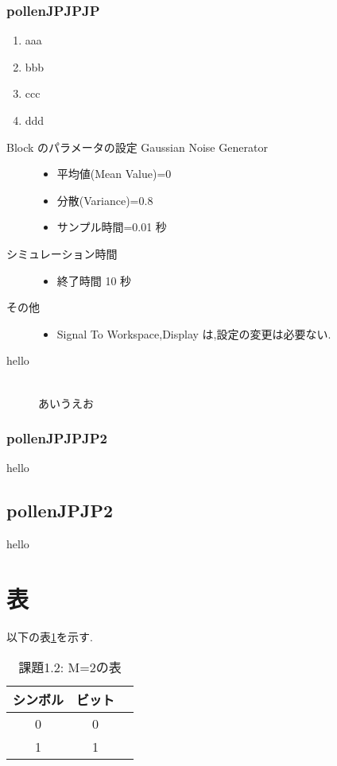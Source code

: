 \documentclass{jsarticle}			%
\begin{document}
			\subsubsection{pollenJPJPJP}
				\begin{enumerate}
					\item aaa
					\item bbb
					\item ccc
					\item ddd
				\end{enumerate}
				\begin{description}
					\item[Block のパラメータの設定 Gaussian Noise Generator]\mbox{}
						\begin{itemize}
							\item 平均値(Mean Value)=0
							\item 分散(Variance)=0.8
							\item サンプル時間=0.01 秒
						\end{itemize}
					\item[シミュレーション時間]\mbox{}
						\begin{itemize}
							\item 終了時間 10 秒
						\end{itemize}
					\item[その他]\mbox{}
						\begin{itemize}
							\item Signal To Workspace,Display は,設定の変更は必要ない.
						\end{itemize}
					\item[hello]\mbox{}\\
						あいうえお
				\end{description}

			\subsubsection{pollenJPJPJP2}
				hello
		\subsection{pollenJPJP2}
			hello
	
	\section{表}
		以下の表\ref{課題1.2: M=2の表}を示す.
		\begin{table}[H]  %
			\caption[M=2]{課題1.2: M=2の表}
			\label{課題1.2: M=2の表}
			\begin{center}
				\setlength{\tabcolsep}{3pt}
				\footnotesize
				\begin{tabular}{|c|c|c} \hline
					シンボル & ビット \\ \hline \hline
					0 & 0 \\ \hline
					1 & 1 \\ \hline
				\end{tabular}
			\end{center}
		\end{table}
		
\end{document}
